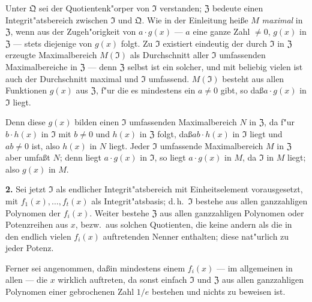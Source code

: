 \documentclass[12pt,a4paper]{article}
\theoremstyle{plain}
\begin{document}
Unter $\mathfrak{Q}$ sei der Quotientenk"orper von $\mathfrak{I}$ verstanden; $\mathfrak{Z}$ bedeute einen Integrit"atsbereich zwischen $\mathfrak{I}$ und $\mathfrak{Q}$. Wie in der Einleitung hei\ss e $M$ \textit{maximal} in $\mathfrak{Z}$, wenn aus der Zugeh"origkeit von $a \cdot g(x)$ --- $a$ eine ganze Zahl $\neq 0$, $g(x)$ in $\mathfrak{Z}$ --- stets diejenige von $g(x)$ folgt. Zu $\mathfrak{I}$ existiert eindeutig der durch $\mathfrak{I}$ in $\mathfrak{Z}$ erzeugte Maximalbereich $M(\mathfrak{I})$ als Durchschnitt aller $\mathfrak{I}$ umfassenden Maximalbereiche in $\mathfrak{Z}$ --- denn $\mathfrak{Z}$ selbst ist ein solcher, und mit beliebig vielen ist auch der Durchschnitt maximal und $\mathfrak{I}$ umfassend. $M(\mathfrak{I})$ besteht aus allen Funktionen $g(x)$ aus $\mathfrak{Z}$, f"ur die es mindestens ein $a \neq 0$ gibt, so da\ss $a \cdot g(x)$ in $\mathfrak{I}$ liegt.

Denn diese $g(x)$ bilden einen $\mathfrak{I}$ umfassenden Maximalbereich $N$ in $\mathfrak{Z}$, da f"ur $b \cdot h(x)$ in $\mathfrak{I}$ mit $b \neq 0$ und $h(x)$ in $\mathfrak{Z}$ folgt, da\ss $ab \cdot h(x)$ in $\mathfrak{I}$ liegt und $ab \neq 0$ ist, also $h(x)$ in $N$ liegt. Jeder $\mathfrak{I}$ umfassende Maximalbereich $M$ in $\mathfrak{Z}$ aber umfa\ss t $N$; denn liegt $a \cdot g(x)$ in $\mathfrak{I}$, so liegt $a \cdot g(x)$ in $M$, da $\mathfrak{I}$ in $M$ liegt; also $g(x)$ in $M$.

\medskip\noindent\textbf{2.}
Sei jetzt $\mathfrak{I}$ als endlicher Integrit"atsbereich mit Einheitselement vorausgesetzt, mit $f_1(x),\ldots,f_t(x)$ als Integrit"atsbasis; d.\,h.\ $\mathfrak{I}$ bestehe aus allen ganzzahligen Polynomen der $f_i(x)$. Weiter bestehe $\mathfrak{Z}$ aus allen ganzzahligen Polynomen oder Potenzreihen aus $x$, bezw.\ aus solchen Quotienten, die keine andern als die in den endlich vielen $f_i(x)$ auftretenden Nenner enthalten; diese nat"urlich zu jeder Potenz.

Ferner sei angenommen, da\ss in mindestens einem $f_i(x)$ --- im allgemeinen in allen --- die $x$ wirklich auftreten, da sonst einfach $\mathfrak{I}$ und $\mathfrak{Z}$ aus allen ganzzahligen Polynomen einer gebrochenen Zahl $1/e$ bestehen und nichts zu beweisen ist.
\end{document}
